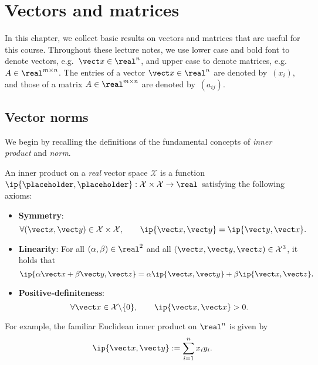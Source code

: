 \chapter{Vectors and matrices}%
\label{cha:vectors_and_matrices}

In this chapter,
we collect basic results on vectors and matrices that are useful for this course.
Throughout these lecture notes,
we use lower case and bold font to denote vectors, e.g.\ $\vect x \in \real^n$,
and upper case to denote matrices, e.g.\ $A \in \real^{m \times n}$.
The entries of a vector $\vect x \in \real^n$ are denoted by~$(x_i)$,
and those of a matrix $A \in \real^{m \times n}$ are denoted by~$(a_{ij})$.


\section{Vector norms}%
\label{sub:vector_norms}

We begin by recalling the definitions of the fundamental concepts of \emph{inner product} and \emph{norm}.
\begin{definition}
    An inner product on a \emph{real} vector space $\mathcal X$ is a function $\ip{\placeholder,\placeholder}: \mathcal X \times \mathcal X \to \real$ satisfying the following axioms:
    \begin{itemize}
        \item
            \textbf{Symmetry}:
            \[
                \forall (\vect x, \vect y) \in \mathcal X \times \mathcal X, \qquad
                \ip{\vect x, \vect y} = \ip{\vect y, \vect x}.
            \]

        \item
            \textbf{Linearity}:
            For all $(\alpha, \beta) \in \real^2$ and all $(\vect x, \vect y, \vect z) \in \mathcal X^3$,
            it holds that
            \[
                \ip{\alpha \vect x + \beta \vect y, \vect z}
                = \alpha \ip{\vect x, \vect y} + \beta \ip{\vect x, \vect z}.
            \]

        \item
            \textbf{Positive-definiteness}:
            \[
                \forall \vect x \in \mathcal X \backslash \{0\}, \qquad
                \ip{\vect x, \vect x} > 0.
            \]
    \end{itemize}
\end{definition}
For example, the familiar Euclidean inner product on $\real^n$ is given by
\[
    \ip{\vect x, \vect y} := \sum_{i=1}^{n} x_i y_i.
\]

